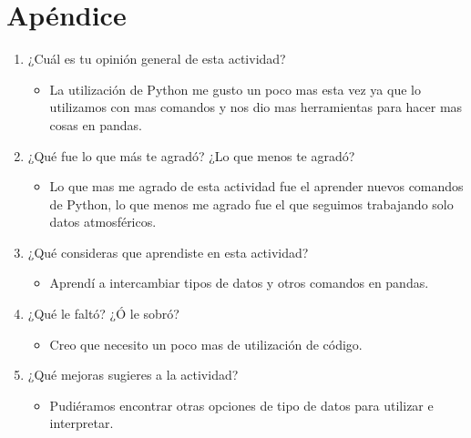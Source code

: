 \documentclass[12pt]{article}
\begin{document}
    \section*{Apéndice}
   		\begin{enumerate}
		\item ¿Cuál es tu opinión general de esta actividad? \par
			\begin{itemize}
				\item La utilización de Python me gusto un poco mas esta vez ya que lo utilizamos con mas comandos y nos dio mas herramientas para hacer mas cosas en pandas.
				\end{itemize}
		\item ¿Qué fue lo que más te agradó? ¿Lo que menos te agradó? \par
			\begin{itemize}
				\item Lo que mas me agrado de esta actividad fue el aprender nuevos comandos de Python, lo que menos me agrado fue el que seguimos trabajando solo datos atmosféricos.
			\end{itemize}
		\item ¿Qué consideras que aprendiste en esta actividad? \par
        	\begin{itemize}
          		\item Aprendí a intercambiar tipos de datos y otros comandos en pandas.
        	\end{itemize}
        \item ¿Qué le faltó? ¿Ó le sobró? \par
        	\begin{itemize}
        		\item Creo que necesito un poco mas de utilización de código.
        	\end{itemize}
        \item ¿Qué mejoras sugieres a la actividad? \par
        	\begin{itemize}
        		\item Pudiéramos encontrar otras opciones de tipo de datos para utilizar e interpretar.
        	\end{itemize}
		\end{enumerate}
	
	
    
    
    
\end{document}
